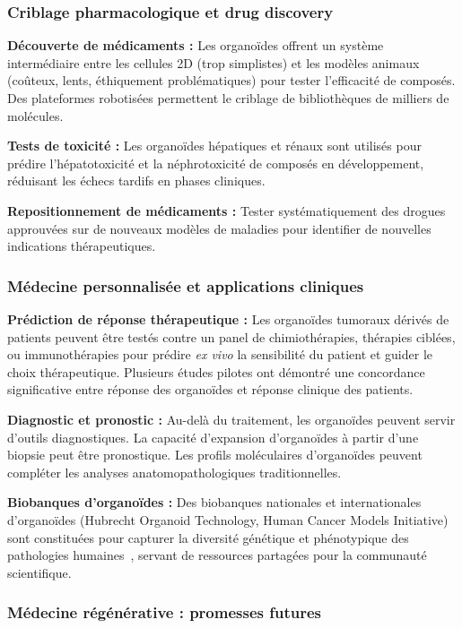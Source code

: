 \subsubsection{Criblage pharmacologique et drug discovery}

\textbf{Découverte de médicaments :}
Les organoïdes offrent un système intermédiaire entre les cellules 2D (trop simplistes) et les modèles animaux (coûteux, lents, éthiquement problématiques) pour tester l'efficacité de composés. Des plateformes robotisées permettent le criblage de bibliothèques de milliers de molécules.

\textbf{Tests de toxicité :}
Les organoïdes hépatiques et rénaux sont utilisés pour prédire l'hépatotoxicité et la néphrotoxicité de composés en développement, réduisant les échecs tardifs en phases cliniques.

\textbf{Repositionnement de médicaments :}
Tester systématiquement des drogues approuvées sur de nouveaux modèles de maladies pour identifier de nouvelles indications thérapeutiques.

\subsubsection{Médecine personnalisée et applications cliniques}

\textbf{Prédiction de réponse thérapeutique :}
Les organoïdes tumoraux dérivés de patients peuvent être testés contre un panel de chimiothérapies, thérapies ciblées, ou immunothérapies pour prédire \textit{ex vivo} la sensibilité du patient et guider le choix thérapeutique. Plusieurs études pilotes ont démontré une concordance significative entre réponse des organoïdes et réponse clinique des patients.

\textbf{Diagnostic et pronostic :}
Au-delà du traitement, les organoïdes peuvent servir d'outils diagnostiques. La capacité d'expansion d'organoïdes à partir d'une biopsie peut être pronostique. Les profils moléculaires d'organoïdes peuvent compléter les analyses anatomopathologiques traditionnelles.

\textbf{Biobanques d'organoïdes :}
Des biobanques nationales et internationales d'organoïdes (Hubrecht Organoid Technology, Human Cancer Models Initiative) sont constituées pour capturer la diversité génétique et phénotypique des pathologies humaines~\cite{Drost2019}, servant de ressources partagées pour la communauté scientifique.

\subsubsection{Médecine régénérative : promesses futures}

